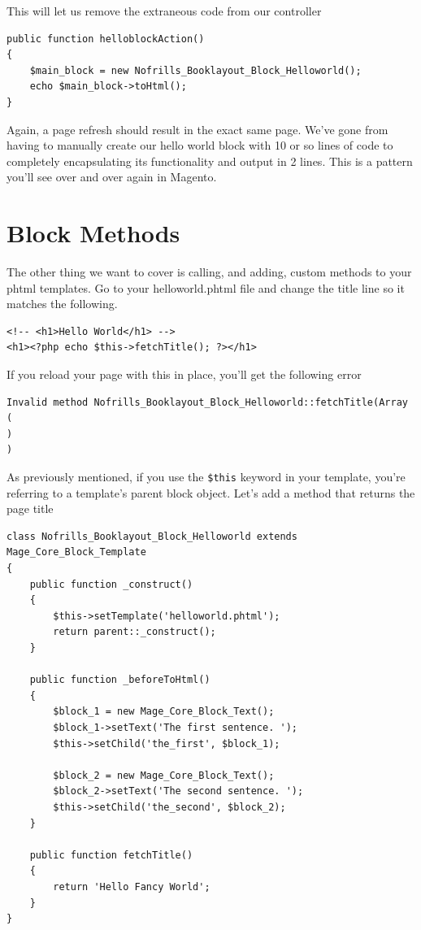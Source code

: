 \documentclass[oneside]{book}
\begin{document}
This will let us remove the extraneous code from our controller

\begin{lstlisting}
public function helloblockAction()
{
    $main_block = new Nofrills_Booklayout_Block_Helloworld();           
    echo $main_block->toHtml();
}

\end{lstlisting}


Again, a page refresh should result in the exact same page.  We've gone from having to manually create our hello world block with 10 or so lines of code to completely encapsulating its functionality and output in 2 lines. This is a pattern you'll see over and over again in Magento. 

\section{Block Methods}

The other thing we want to cover is calling, and adding, custom methods to your phtml templates.   Go to your helloworld.phtml file and change the title line so it matches the following.

\begin{lstlisting}
<!-- <h1>Hello World</h1> -->
<h1><?php echo $this->fetchTitle(); ?></h1>

\end{lstlisting}


If you reload your page with this in place, you'll get the following error

\begin{lstlisting}
Invalid method Nofrills_Booklayout_Block_Helloworld::fetchTitle(Array
(
)
)

\end{lstlisting}


As previously mentioned, if you use the \footnotesize\texttt{\$this} \normalsize  keyword in your template, you're referring to a template's parent block object.  Let's add a method that returns the page title

\begin{lstlisting}
class Nofrills_Booklayout_Block_Helloworld extends Mage_Core_Block_Template
{
    public function _construct()
    {
        $this->setTemplate('helloworld.phtml');
        return parent::_construct();
    }

    public function _beforeToHtml()
    {
        $block_1 = new Mage_Core_Block_Text();
        $block_1->setText('The first sentence. ');
        $this->setChild('the_first', $block_1);     

        $block_2 = new Mage_Core_Block_Text();
        $block_2->setText('The second sentence. ');     
        $this->setChild('the_second', $block_2);        
    }

    public function fetchTitle()
    {
        return 'Hello Fancy World';
    }
}

\end{lstlisting}
\end{document}
